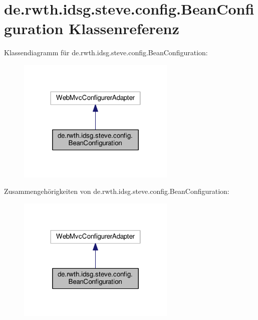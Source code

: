 \hypertarget{classde_1_1rwth_1_1idsg_1_1steve_1_1config_1_1_bean_configuration}{\section{de.\-rwth.\-idsg.\-steve.\-config.\-Bean\-Configuration Klassenreferenz}
\label{classde_1_1rwth_1_1idsg_1_1steve_1_1config_1_1_bean_configuration}
}


Klassendiagramm für de.\-rwth.\-idsg.\-steve.\-config.\-Bean\-Configuration\-:\nopagebreak
\begin{figure}[H]
\begin{center}
\leavevmode
\includegraphics[width=214pt]{classde_1_1rwth_1_1idsg_1_1steve_1_1config_1_1_bean_configuration__inherit__graph}
\end{center}
\end{figure}


Zusammengehörigkeiten von de.\-rwth.\-idsg.\-steve.\-config.\-Bean\-Configuration\-:\nopagebreak
\begin{figure}[H]
\begin{center}
\leavevmode
\includegraphics[width=214pt]{classde_1_1rwth_1_1idsg_1_1steve_1_1config_1_1_bean_configuration__coll__graph}
\end{center}
\end{figure}
